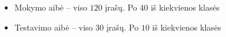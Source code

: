 \begin{itemize}
    \item Mokymo aibė – viso $120$ įrašų. Po $40$ iš kiekvienos klasės
    \item Testavimo aibė – viso $30$ įrašų. Po $10$ iš kiekvienos klasės
\end{itemize}
